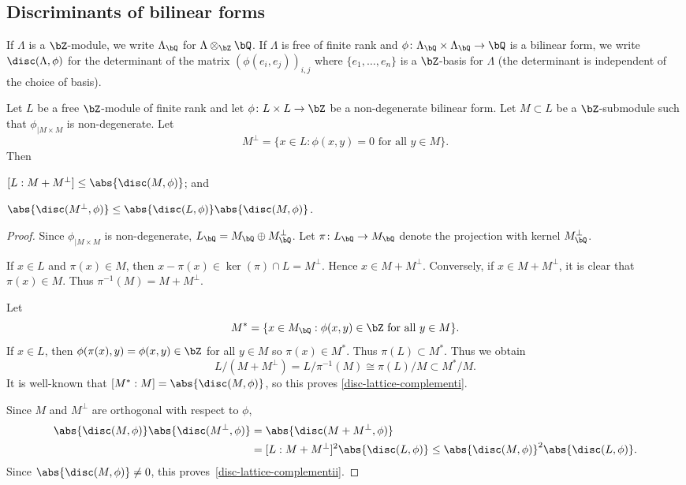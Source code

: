 \subsection{Discriminants of bilinear forms}

If $\Lambda$ is a $\bZ$-module, we write $\Lambda_\bQ$ for $\Lambda\otimes_\bZ\bQ$. If $\Lambda$ is free of finite rank and $\phi \colon \Lambda_\bQ \times \Lambda_\bQ \to \bQ$ is a bilinear form, we write $\disc(\Lambda,\phi)$ for the determinant of the matrix $(\phi(e_i,e_j))_{i,j}$ where $\{e_1,\ldots,e_n\}$ is a $\bZ$-basis for $\Lambda$ (the determinant is independent of the choice of basis).

\begin{lemma} \label{disc-lattice-complement}
Let $L$ be a free $\bZ$-module of finite rank and let $\phi \colon L \times L \to \bZ$ be a non-degenerate bilinear form.
Let $M \subset L$ be a $\bZ$-submodule such that $\phi_{|M \times M}$ is non-degenerate.
Let
\[
M^\perp = \{ x \in L : \phi(x,y) = 0 \text{ for all } y \in M \}.
\]
Then
\begin{enumeratei}
\item\label{disc-lattice-complementi} $[L : M + M^\perp] \leq \abs{\disc(M, \phi)}$; and
\item\label{disc-lattice-complementii} $\abs{\disc(M^\perp, \phi)} \leq \abs{\disc(L, \phi)} \abs{\disc(M, \phi)}$.
\end{enumeratei}
\end{lemma}

\begin{proof}
Since $\phi_{|M \times M}$ is non-degenerate, $L_\bQ = M_\bQ \oplus M_\bQ^\perp$.
Let $\pi \colon L_\bQ \to M_\bQ$ denote the projection with kernel $M_\bQ^\perp$.

If $x \in L$ and $\pi(x) \in M$, then $x-\pi(x) \in \ker(\pi) \cap L = M^\perp$.
Hence $x \in M + M^\perp$.
Conversely, if $x \in M + M^\perp$, it is clear that $\pi(x) \in M$.
Thus $\pi^{-1}(M) = M + M^\perp$.

Let
\[
M^* = \{ x \in M_\bQ : \phi(x, y) \in \bZ \text{ for all } y \in M \}.
\]
If $x \in L$, then $\phi(\pi(x),y) = \phi(x,y) \in \bZ$ for all $y \in M$ so $\pi(x) \in M^*$.
Thus $\pi(L) \subset M^*$.
Thus we obtain
\[
L/(M + M^\perp) = L/\pi^{-1}(M) \cong \pi(L)/M \subset M^*/M.
\]
It is well-known that $[M^*:M] = \abs{\disc(M,\phi)}$, so this proves \eqref{disc-lattice-complementi}.

Since $M$ and $M^\perp$ are orthogonal with respect to $\phi$,
\begin{align*}
\abs{\disc(M, \phi)} \abs{\disc(M^\perp, \phi)}
& = \abs{\disc(M + M^\perp, \phi)}
\\& = [L:M+M^\perp]^2 \abs{\disc(L, \phi)}
\leq \abs{\disc(M, \phi)}^2 \abs{\disc(L, \phi)}.
\end{align*}
Since $\abs{\disc(M, \phi)} \neq 0$, this proves~\eqref{disc-lattice-complementii}.
\end{proof}

